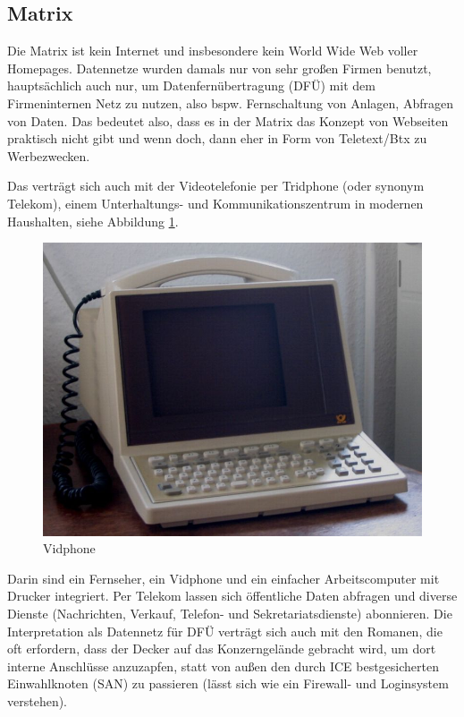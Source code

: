 \documentclass[a4paper]{scrartcl}
\begin{document}
\subsection{Matrix}
Die Matrix ist kein Internet und insbesondere kein World Wide Web voller Homepages.
Datennetze wurden damals nur von sehr großen Firmen benutzt, hauptsächlich auch nur, um Datenfernübertragung (DFÜ) mit 
dem Firmeninternen Netz zu nutzen, also bspw. Fernschaltung von Anlagen, Abfragen von Daten. 
Das bedeutet also, dass es in der Matrix das Konzept von Webseiten praktisch nicht gibt und wenn doch, dann eher in Form
von Teletext/Btx zu Werbezwecken.

Das verträgt sich auch mit der Videotelefonie per Tridphone (oder synonym Telekom), einem Unterhaltungs- und Kommunikationszentrum in modernen Haushalten, siehe Abbildung \ref{fig:Vidphone}.
\begin{figure}[ht]
 \centering
 \includegraphics[scale=0.4]{Bilder/777px-Btx_device}
 \caption{Vidphone}
 \label{fig:Vidphone}
\end{figure}

Darin sind ein Fernseher, ein Vidphone und ein einfacher Arbeitscomputer 
mit Drucker integriert.
Per Telekom lassen sich öffentliche Daten abfragen und diverse Dienste (Nachrichten, Verkauf, Telefon- und
Sekretariatsdienste) abonnieren.
Die Interpretation als Datennetz für DFÜ verträgt sich auch mit den Romanen, die oft erfordern, dass der Decker auf das
Konzerngelände gebracht wird, um dort interne Anschlüsse anzuzapfen, statt von außen den durch ICE bestgesicherten
Einwahlknoten (SAN) zu passieren (lässt sich wie ein Firewall- und Loginsystem verstehen).
\end{document}
